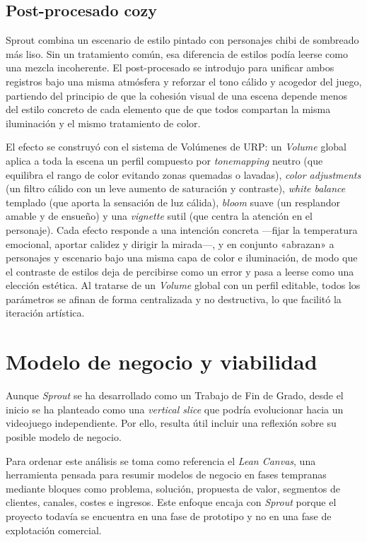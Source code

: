 \documentclass[12pt,twoside,titlepage]{report}
\begin{document}
\subsection{Post-procesado cozy}

Sprout combina un escenario de estilo pintado con personajes chibi de sombreado más liso. Sin un tratamiento común, esa diferencia de estilos podía leerse como una mezcla incoherente. El post-procesado se introdujo para unificar ambos registros bajo una misma atmósfera y reforzar el tono cálido y acogedor del juego, partiendo del principio de que la cohesión visual de una escena depende menos del estilo concreto de cada elemento que de que todos compartan la misma iluminación y el mismo tratamiento de color.

El efecto se construyó con el sistema de Volúmenes de URP: un \textit{Volume} global aplica a toda la escena un perfil compuesto por \textit{tonemapping} neutro (que equilibra el rango de color evitando zonas quemadas o lavadas), \textit{color adjustments} (un filtro cálido con un leve aumento de saturación y contraste), \textit{white balance} templado (que aporta la sensación de luz cálida), \textit{bloom} suave (un resplandor amable y de ensueño) y una \textit{vignette} sutil (que centra la atención en el personaje). Cada efecto responde a una intención concreta ---fijar la temperatura emocional, aportar calidez y dirigir la mirada---, y en conjunto «abrazan» a personajes y escenario bajo una misma capa de color e iluminación, de modo que el contraste de estilos deja de percibirse como un error y pasa a leerse como una elección estética. Al tratarse de un \textit{Volume} global con un perfil editable, todos los parámetros se afinan de forma centralizada y no destructiva, lo que facilitó la iteración artística.

\section{Modelo de negocio y viabilidad}
Aunque \textit{Sprout} se ha desarrollado como un Trabajo de Fin de Grado, desde el inicio se ha planteado como una \textit{vertical slice} que podría evolucionar hacia un videojuego independiente. Por ello, resulta útil incluir una reflexión sobre su posible modelo de negocio. 

Para ordenar este análisis se toma como referencia el \textit{Lean Canvas}, una herramienta pensada para resumir modelos de negocio en fases tempranas mediante bloques como problema, solución, propuesta de valor, segmentos de clientes, canales, costes e ingresos. Este enfoque encaja con \textit{Sprout} porque el proyecto todavía se encuentra en una fase de prototipo y no en una fase de explotación comercial.
\end{document}
